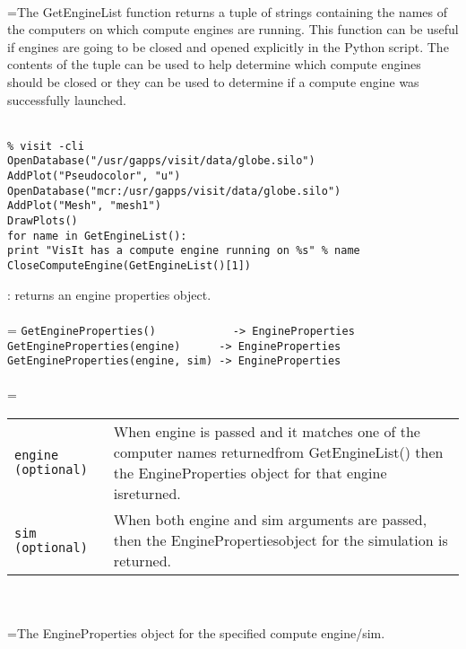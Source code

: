 \documentclass[10pt,a4paper]{report}
\begin{document}
 \\ 
\hangindent=\parindent The GetEngineList function returns a tuple of strings containing the names of the computers on which compute engines are running. This function can be useful if engines are going to be closed and opened explicitly in the Python script. The contents of the tuple can be used to help determine which compute engines should be closed or they can be used to determine if a compute engine was successfully launched. \\[-3mm] 

\\[-6mm]
\begin{verbatim}% visit -cli
OpenDatabase("/usr/gapps/visit/data/globe.silo")
AddPlot("Pseudocolor", "u")
OpenDatabase("mcr:/usr/gapps/visit/data/globe.silo")
AddPlot("Mesh", "mesh1")
DrawPlots()
for name in GetEngineList():
print "VisIt has a compute engine running on %s" % name
CloseComputeEngine(GetEngineList()[1])
\end{verbatim}
\newpage


{}
: returns an engine properties object.\\[-3mm]

 \\ 
\hangindent=\parindent 
\verb!GetEngineProperties()            -> EngineProperties!\\ 
\verb!GetEngineProperties(engine)      -> EngineProperties!\\ 
\verb!GetEngineProperties(engine, sim) -> EngineProperties!\\ [-3mm]

 \\ 
\hangindent=\parindent 
\begin{tabular}{lp{9cm}}
\verb!engine (optional)! & When engine is passed and it matches one of the computer names returnedfrom GetEngineList() then the EngineProperties object for that engine isreturned. \\
\verb!sim (optional)! & When both engine and sim arguments are passed, then the EnginePropertiesobject for the simulation is returned. \\
\end{tabular} \\[-2mm]


 \\ 
\hangindent=\parindent The EngineProperties object for the specified compute engine/sim. \\[-3mm] 
\end{document}
